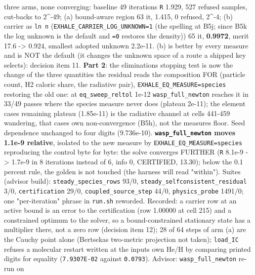 \documentclass[english,a4paper]{my_memo}
\begin{document}
\begin{itemize}
  three arms, none converging: baseline 49 iterations \texttt{\textbar{}\textbar{}R\textbar{}\textbar{}} 1.929, 527
  refused samples, cut-backs to 2\^{}-49; (a) bound-aware region 63 it, 1.415,
  0 refused, 2\^{}-4; (b) carrier as \texttt{ln\ n} (\texttt{EXHALE\_CARRIER\_LOG\_UNKNOWN=1} (the spelling at B5j; since B5k the log unknown is the default and \texttt{=0} restores the density))
  65 it, \textbf{0.9972}, merit 17.6 -\textgreater{} 0.924, smallest adopted unknown 2.2e-11.
  (b) is better by every measure and is NOT the default (it changes the
  unknown space of a route a shipped key selects): decision item 11. \textbf{Part
  2}: the elimination\textquotesingle s stopping test is now the change of the three
  quantities the residual reads the composition FOR (particle count, H2
  caloric share, the radiative pair), \texttt{EXHALE\_EQ\_MEASURE=species} restoring
  the old one: at \texttt{eq\_sweep\_reltol} 1e-12 \texttt{wasp\_full\_newton} reaches it in
  33/49 passes where the species measure never does (plateau 2e-11); the
  element case\textquotesingle s remaining plateau (1.85e-11) is the radiative channel at
  cells 441-459 wandering, that case\textquotesingle s own non-convergence (B5h), not the
  measure\textquotesingle s floor. Seed dependence unchanged to four digits (9.736e-10).
  \textbf{\texttt{wasp\_full\_newton} moves 1.1e-9 relative}, isolated to the new measure
  by \texttt{EXHALE\_EQ\_MEASURE=species} reproducing the control byte for byte: the
  solve converges FURTHER (\texttt{\textbar{}\textbar{}R\textbar{}\textbar{}} 8.1e-9 -\textgreater{} 1.7e-9 in 8 iterations instead
  of 6, info 0, CERTIFIED, 13.30); below the 0.1 percent rule, the golden
  is not touched (the harness will read "within"). Suites (advisor build):
  \texttt{steady\_species\_rows} 93/0, \texttt{steady\_selfconsistent\_residual} 3/0,
  \texttt{certification} 29/0, \texttt{coupled\_source\_step} 44/0, \texttt{physics\_probe} 1491/0;
  one "per-iteration" phrase in \texttt{run.sh} reworded. Recorded: a carrier row
  at an active bound is an error to the certification (row 1.00000 at cell
  215) and a constrained optimum to the solver, so a bound-constrained
  stationary state has a multiplier there, not a zero row (decision item
  12); 28 of 64 steps of arm (a) are the Cauchy point alone (Bertsekas\textquotesingle{}
  two-metric projection not taken); \texttt{load\_IC} refuses a molecular restart
  written at the input\textquotesingle s own He/H by comparing printed digits for equality
  (\texttt{7.9307E-02} against \texttt{0.0793}). Advisor: \texttt{wasp\_full\_newton} re-run on

\end{itemize}
\end{document}
